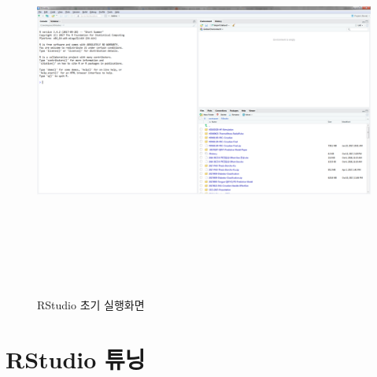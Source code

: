 \documentclass[12pt,a4paper]{book}
\theoremstyle{definition}
\theoremstyle{definition}
\theoremstyle{definition}
\theoremstyle{remark}
\begin{document}
\begin{figure}[H]
{
  \centering
  \includegraphics[width = 15cm, height = 13cm]{Figures/Rstudio-init.png}
  \caption[RStudio 초기 실행화면]{RStudio 초기 실행화면}\label{fig:Rstudio-install-05}
}
\end{figure}

\section{RStudio 튜닝}\label{rstudio-}
\end{document}
